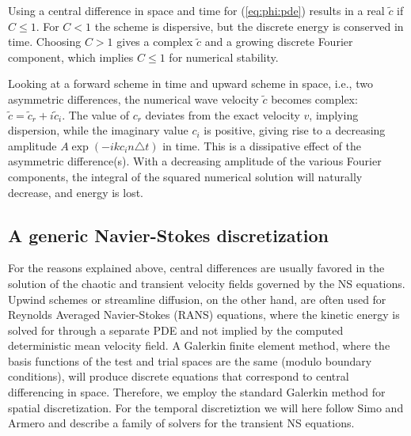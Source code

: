 Using a central difference in space and time for (\ref{eq:phi:pde})
results in a real $\tilde c$ if $C\leq 1$.
For $C<1$ the scheme is dispersive, but
the discrete energy  is conserved in time.
Choosing $C>1$ gives a complex $\tilde c$ and a growing discrete Fourier
component, which implies $C\leq1$ for numerical stability.

Looking at a forward scheme in time and upward scheme in space, i.e.,
two asymmetric differences, the numerical wave velocity $\tilde c$ becomes
complex: $\tilde c = \tilde c_r + i\tilde c_i$. 
The value of $c_r$ deviates from the exact velocity $v$, implying
dispersion, while the imaginary value $c_i$ is positive, giving rise
to a decreasing amplitude $A\exp{(-ikc_i n\triangle t)}$ in time.
This is a dissipative effect of the asymmetric difference(s). 
With a decreasing amplitude of the various
Fourier components, the integral of the squared numerical solution will
naturally decrease, and energy is lost.


\subsection{A generic Navier-Stokes discretization}
\label{sec:NS-solver}

For the reasons explained above, central differences are
usually favored in the solution of the chaotic and transient velocity
fields governed by the NS equations. Upwind schemes or streamline
diffusion, on the other hand, are often used for Reynolds Averaged
Navier-Stokes (RANS) equations, where the kinetic energy is solved for
through a separate PDE and not implied by the computed deterministic
mean velocity field. A Galerkin finite element method, where the basis functions
of the test and trial spaces are the same (modulo boundary conditions),
will produce discrete equations that correspond to central differencing 
in space. Therefore, we employ the standard Galerkin method for spatial
discretization. For the temporal
discretiztion we will here follow Simo and Armero \cite{simo94} and describe a family of solvers for the transient NS equations.

